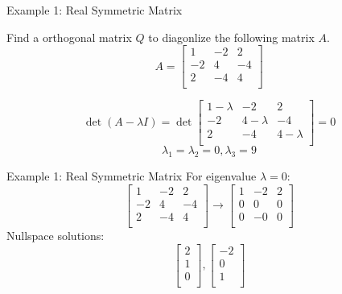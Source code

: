 \documentclass{beamer}
\begin{document}
\begin{frame}{Example 1: Real Symmetric Matrix}
    \begin{example}
        Find a orthogonal matrix $Q$ to diagonlize the following matrix $A$.
        \begin{equation*}
            A=\left[ \begin{matrix}
                1&		-2&		2\\
                -2&		4&		-4\\
                2&		-4&		4\\
            \end{matrix} \right]
        \end{equation*}
    \end{example}
    \begin{equation*}
        \det \left( A-\lambda I \right) =\det \left[ \begin{matrix}
            1-\lambda&		-2&		2\\
            -2&		4-\lambda&		-4\\
            2&		-4&		4-\lambda\\
        \end{matrix} \right] =0
    \end{equation*}
    \begin{equation*}
        \lambda_1=\lambda_2=0, \lambda_3=9
    \end{equation*}
\end{frame}

\begin{frame}{Example 1: Real Symmetric Matrix}
For eigenvalue $\lambda=0$:
\begin{equation*}
    \left[ \begin{matrix}
        1&		-2&		2\\
        -2&		4&		-4\\
        2&		-4&		4\\
    \end{matrix} \right] \rightarrow \left[ \begin{matrix}
        1&		-2&		2\\
        0&		0&		0\\
        0&		-0&		0\\
    \end{matrix} \right]
\end{equation*}
Nullspace solutions:
\begin{equation*}
    \left[ \begin{array}{c}
        2\\
        1\\
        0\\
    \end{array} \right] ,\left[ \begin{array}{c}
        -2\\
        0\\
        1\\
    \end{array} \right]
\end{equation*}

\end{frame}
\end{document}
